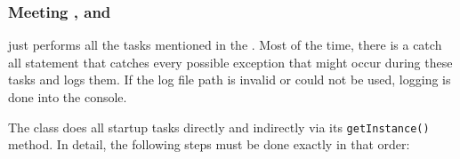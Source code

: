 
\subsubsection{Meeting \REQUcontextStartupTasks{}, \REQUcontextRobustStartup{} and 
\REQUcontextVerboseLogging{}}
\label{sec:REQUcontextStartupTasks}

\COMPcontext{} just performs all the tasks mentioned in the \REQUcontextStartupTasks{}. Most of the time, there is a catch all statement that catches every possible exception that might occur during these tasks and logs them. If the log file path is invalid or could not be used, logging is done into the console.

The class \CLASSJMetaContext{} does all startup tasks directly and indirectly via its \texttt{getInstance()} method. In detail, the following steps must be done exactly in that order:
